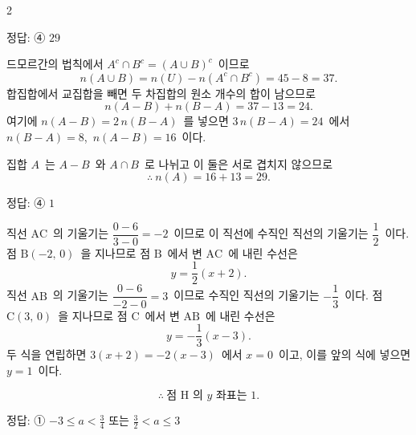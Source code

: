 \documentclass[10pt,fleqn]{article}
\begin{document}
\begin{multicols*}{2}


\begin{dmanswerbox}
정답: ④ $29$
\end{dmanswerbox}

드모르간의 법칙에서 $A^{c}\cap B^{c}=(A\cup B)^{c}$\ 이므로
$$n(A\cup B)=n(U)-n(A^{c}\cap B^{c})=45-8=37.$$
합집합에서 교집합을 빼면 두 차집합의 원소 개수의 합이 남으므로
$$n(A-B)+n(B-A)=37-13=24.$$
여기에 $n(A-B)=2\,n(B-A)$\ 를 넣으면 $3\,n(B-A)=24$\ 에서 $n(B-A)=8$,\ $n(A-B)=16$\ 이다.

집합 $A$\ 는 $A-B$\ 와 $A\cap B$\ 로 나뉘고 이 둘은 서로 겹치지 않으므로
$$\therefore\ n(A)=16+13=29.$$


\begin{dmanswerbox}
정답: ④ $1$
\end{dmanswerbox}

직선 $\mathrm{AC}$\ 의 기울기는 $\dfrac{0-6}{3-0}=-2$\ 이므로 이 직선에 수직인 직선의 기울기는 $\dfrac12$\ 이다. 점 $\mathrm{B}(-2,\,0)$\ 을 지나므로 점 $\mathrm{B}$\ 에서 변 $\mathrm{AC}$\ 에 내린 수선은
$$y=\dfrac12(x+2).$$
직선 $\mathrm{AB}$\ 의 기울기는 $\dfrac{0-6}{-2-0}=3$\ 이므로 수직인 직선의 기울기는 $-\dfrac13$\ 이다. 점 $\mathrm{C}(3,\,0)$\ 을 지나므로 점 $\mathrm{C}$\ 에서 변 $\mathrm{AB}$\ 에 내린 수선은
$$y=-\dfrac13(x-3).$$
두 식을 연립하면 $3(x+2)=-2(x-3)$\ 에서 $x=0$\ 이고, 이를 앞의 식에 넣으면 $y=1$\ 이다.

$$\therefore\ \text{점 }\mathrm{H}\text{ 의 }y\text{ 좌표는 }1.$$


\begin{dmanswerbox}
정답: ① $-3\le a<\frac34$ 또는 $\frac32<a\le 3$
\end{dmanswerbox}


\end{multicols*}
\end{document}
